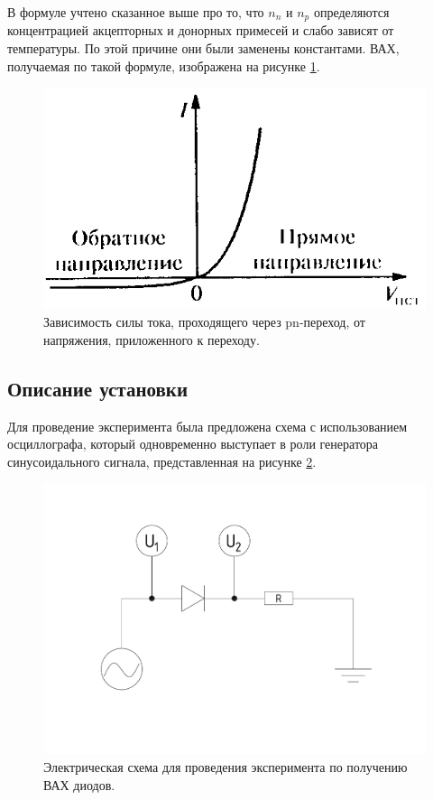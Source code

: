 \documentclass[a4paper, 12pt]{article}
\begin{document}
В формуле учтено сказанное выше про то, что $n_n$ и $n_p$ определяются концентрацией акцепторных и донорных примесей и слабо зависят от температуры. По этой причине они были заменены константами. ВАХ, получаемая по такой формуле, изображена на рисунке \ref{fig:2_VAC}.

\begin{figure}[H]
	\centering
	\includegraphics[width=0.5\linewidth]{2_VAC}
	\caption{Зависимость силы тока, проходящего через pn-переход, от напряжения, приложенного к переходу.}
	\label{fig:2_VAC}
\end{figure}

\subsection{Описание установки}

Для проведение эксперимента была предложена схема с использованием осциллографа, который одновременно выступает в роли генератора синусоидального сигнала, представленная на рисунке \ref{fig:2_Experiment_Scheme}.

\begin{figure}[H]
	\centering
	\includegraphics[width=\linewidth]{2_Experiment_Scheme}
	\caption{Электрическая схема для проведения эксперимента по получению ВАХ диодов.}
	\label{fig:2_Experiment_Scheme}
\end{figure}
\end{document}
